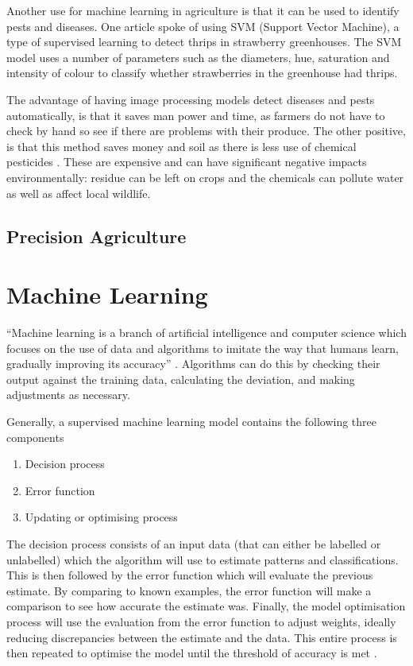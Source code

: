 Another use for machine learning in agriculture is that it can be used to identify pests and diseases. One article \cite{strawberryThrips} spoke of using SVM (Support Vector Machine), a type of supervised learning to detect thrips in strawberry greenhouses. The SVM model uses a number of parameters such as the diameters, hue, saturation and intensity of colour to classify whether strawberries in the greenhouse had thrips.

The advantage of having image processing models detect diseases and pests automatically, is that it saves man power and time, as farmers do not have to check by hand so see if there are problems with their produce. The other positive, is that this method saves money and soil as there is less use of chemical pesticides \cite{MLAgricultureLiakos}. These are expensive and can have significant negative impacts environmentally: residue can be left on crops and the chemicals can pollute water as well as affect local wildlife.

\subsection{Precision Agriculture}




\section{Machine Learning}

“Machine learning is a branch of artificial intelligence and computer science which focuses on the use of data and algorithms to imitate the way that humans learn, gradually improving its accuracy” \cite{machineLearningIBM}. Algorithms can do this by checking their output against the training data, calculating the deviation, and making adjustments as necessary.

Generally, a supervised machine learning model contains the following three components
\begin{enumerate}
    \item Decision process
    \item Error function
    \item Updating or optimising process
\end{enumerate}

The decision process consists of an input data (that can either be labelled or unlabelled) which the algorithm will use to estimate patterns and classifications. This is then followed by the error function which will evaluate the previous estimate. By comparing to known examples, the error function will make a comparison to see how accurate the estimate was.
Finally, the model optimisation process will use the evaluation from the error function to adjust weights, ideally reducing discrepancies between the estimate and the data. This entire process is then repeated to optimise the model until the threshold of accuracy is met \cite{machineLearningIBM} \cite{machineLearningBerkeley} \cite{machineLearningNvidia}.

